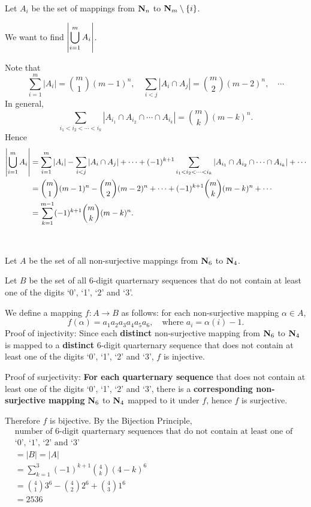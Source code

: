 \begin{solution}
Let $A_i$ be the set of mappings from $\mathbf N_n$ to $\mathbf N_m\setminus\{i\}$.

We want to find $\displaystyle\left|\bigcup_{i=1}^{m}A_i\right|$.

Note that
\[\sum_{i=1}^{m}|A_i|=\binom{m}{1}(m-1)^n,\quad\sum_{i<j}|A_i\cap A_j|=\binom{m}{2}(m-2)^n,\quad\cdots\]
In general,
\[\sum_{i_1<i_2<\cdots<i_k}|A_{i_1}\cap A_{i_2}\cap\cdots\cap A_{i_k}|=\binom{m}{k}(m-k)^n.\]
Hence
\begin{align*}
\left|\bigcup_{i=1}^{m}A_i\right|
&=\sum_{i=1}^m |A_i|-\sum_{i<j}|A_i\cap A_j|+\cdots+(-1)^{k+1}\sum_{i_1<i_2<\cdots<i_k}|A_{i_1}\cap A_{i_2}\cap\cdots\cap A_{i_k}|+\cdots\\
&=\binom{m}{1}(m-1)^n-\binom{m}{2}(m-2)^n+\cdots+(-1)^{k+1}\binom{m}{k}(m-k)^n+\cdots\\
&=\sum_{k=1}^{m-1}(-1)^{k+1}\binom{m}{k}(m-k)^n.
\end{align*}

\

Let $A$ be the set of all non-surjective mappings from $\mathbf N_6$ to $\mathbf N_4$.

Let $B$ be the set of all 6-digit quarternary sequences that do not contain at least one of the digits `0', `1', `2' and `3'.

We define a mapping $f:A\to B$ as follows: for each non-surjective mapping $\alpha\in A$,
\[f(\alpha)=a_1a_2a_3a_4a_5a_6,\quad\text{where }a_i=\alpha(i)-1.\]
Proof of injectivity: Since each \textbf{distinct} non-surjective mapping from $\mathbf N_6$ to $\mathbf N_4$ is mapped to a \textbf{distinct} 6-digit quarternary sequence that does not contain at least one of the digits `0', `1', `2' and `3', $f$ is injective.

Proof of surjectivity: \textbf{For each quarternary sequence} that does not contain at least one of the digits `0', `1', `2' and `3', there is a \textbf{corresponding non-surjective mapping} $\mathbf N_6$ to $\mathbf N_4$ mapped to it under $f$, hence $f$ is surjective.

Therefore $f$ is bijective. By the Bijection Principle,
\begin{align*}
&\text{number of 6-digit quarternary sequences that do not contain at least one of the digits}\\
&\text{`0', `1', `2' and `3'}\\
&=|B|=|A|\\
&=\sum_{k=1}^3(-1)^{k+1}\binom{4}{k}(4-k)^6\\
&=\binom{4}{1}3^6-\binom{4}{2}2^6+\binom{4}{3}1^6\\
&=\boxed{2536}
\end{align*}
\end{solution}

